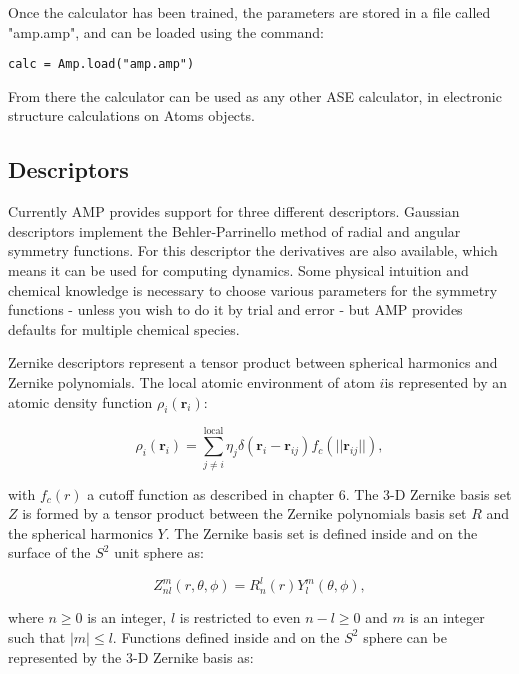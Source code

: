 Once the calculator has been trained, the parameters
are stored in a file called "amp.amp",
and can be loaded using the command:

\begin{verbatim}
calc = Amp.load("amp.amp")
\end{verbatim}

From there the calculator can be used as any other ASE calculator,
in electronic structure calculations on Atoms objects.

\subsection{Descriptors}
Currently AMP provides support for three different descriptors.
Gaussian descriptors implement the Behler-Parrinello method
of radial and angular symmetry functions. For this descriptor
the derivatives are also available, which means it can be used
for computing dynamics. Some physical intuition and chemical knowledge
is necessary to choose various parameters for the symmetry functions -
unless you wish to do it by trial and error - but AMP provides
defaults for multiple chemical species.
\par
Zernike descriptors represent a tensor product between spherical
harmonics and Zernike polynomials. The local atomic environment
of atom $i$is represented by an atomic density function $\rho_i(\bm{r}_i)$:

\begin{equation}
 \rho_i(\bm{r}_i) = \sum_{j\neq i}^{\text{local}}
    \eta_j \delta \left( \bm{r}_i - \bm{r}_{ij} \right)
    f_c \left( \lvert \lvert \bm{r}_{ij} \rvert \rvert \right) , 
\end{equation}

with $f_c(r)$ a cutoff function as described in chapter 6.
The 3-D Zernike basis set $Z$ is formed by a tensor product between
the Zernike polynomials basis set $R$ and the spherical harmonics
$Y$. The Zernike basis set is defined inside and on the surface
of the $S^2$ unit sphere as:

\begin{equation}
 Z_{nl}^m (r, \theta, \phi) = R_n^l(r) Y_l^m(\theta, \phi) , 
\end{equation}

where $n \geq 0$ is an integer, $l$ is restricted to even $n - l \geq 0$
and $m$ is an integer such that $\left| m \right| \leq l$.
Functions defined inside and on the $S^2$ sphere
can be represented by the 3-D Zernike basis as:

